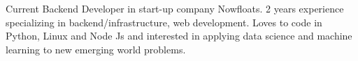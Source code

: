 

\begin{cvparagraph}

Current Backend Developer in start-up company Nowfloats. 2 years experience specializing in backend/infrastructure, web development. Loves to code in Python, Linux and Node Js and interested in applying data science and machine learning to new emerging world problems. 
\end{cvparagraph}
